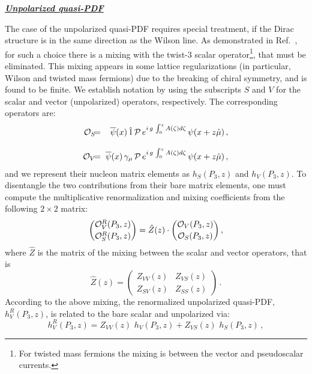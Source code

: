 \documentclass[12pt,tighten,nofootinbib,amssymb,floatfix]{article}
\newcommand{\bea}{\begin{eqnarray}}
\newcommand{\eea}{\end{eqnarray}}
\begin{document}
\vspace*{0.75cm}
\centerline{\bf\underline{\textit{Unpolarized quasi-PDF}}}
\vskip 0.25cm

The case of the unpolarized quasi-PDF requires special treatment, if the Dirac structure is in the same direction
as the Wilson line. As demonstrated in Ref.~\cite{Constantinou:2017sej}, for such a choice there is a mixing with 
the twist-3 scalar operator\footnote{For twisted mass fermions the mixing is between the vector and pseudoscalar 
currents.}, that must be eliminated. This mixing appears in some lattice regularizations (in particular, Wilson and twisted mass fermions) due to the breaking of chiral symmetry, and is found to be finite. 
We establish notation by using the subscripts $S$ and $V$ for the scalar and vector (unpolarized) operators, respectively. 
The corresponding operators are:
\bea
{\cal O}_S \hspace*{-0.15cm}&=&\hspace*{-0.15cm} \overline \psi(x) \, \hat{1} \,\mathcal{P}\, e^{i\,g\,\int_{0}^{z} A(\zeta) d\zeta}\, \psi(x+z\hat{\mu})\,, \\[2ex]
{\cal O}_V \hspace*{-0.15cm}&=&\hspace*{-0.15cm} \overline \psi(x) \, \gamma_\mu \,\mathcal{P}\, e^{i\,g\,\int_{0}^{z} A(\zeta) d\zeta}\, \psi(x+z\hat{\mu})\,,
\eea
and we represent their nucleon matrix elements as $h_S(P_3,z)$ and $h_V(P_3,z)$.
To disentangle the two contributions from their bare matrix elements, one must compute the multiplicative renormalization 
and mixing coefficients from the following $2{\times}2$ matrix:
\begin{equation}
  \binom{{\cal O}^R_V(P_3,z)}{{\cal O}^R_S(P_3,z)} = \hat{Z}(z)\cdot
  \binom{{\cal O}_V(P_3,z)}{{\cal O}_S(P_3,z)}\,,
\end{equation}
where $\hat{Z}$ is the matrix of the mixing between the scalar and vector operators, that is
\begin{equation}
 \hat{Z}(z) = \begin{pmatrix} Z_{VV}(z) & Z_{VS}(z) \\ Z_{SV}(z) & Z_{SS}(z) \end{pmatrix} \,.
\end{equation}
%
According to the above mixing, the renormalized unpolarized quasi-PDF, $h^R_V(P_3,z)$, is related to the bare scalar and unpolarized via:
%
\begin{equation}
h^R_V(P_3,z) = Z_{VV}(z) \,\, h_V(P_3,z) + Z_{VS}(z) \,\, h_S(P_3,z) \,,
\label{h_R}
\end{equation}
\end{document}
